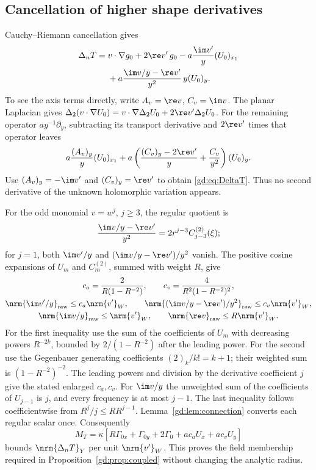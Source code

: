 \subsection{Cancellation of higher shape derivatives}
\label{gd:sec:no-loss}
Cauchy--Riemann cancellation gives
\begin{equation}\label{gd:eq:DeltaT}
 \begin{split}
 \Delta_nT={}&v\cdot\nabla g_0+2\re v'\,g_0
       -a\frac{\im v'}y(U_0)_{x_1}\\
       &+a\frac{\im v/y-\re v'}{y^2}\,y(U_0)_y .
 \end{split}
\end{equation}
To see the axis terms directly, write $A_v=\re v$, $C_v=\im v$.
The planar Laplacian gives
$\Delta_2(v\cdot\nabla U_0)
=v\cdot\nabla\Delta_2U_0+2\re v'\Delta_2U_0$.
For the remaining operator $ay^{-1}\partial_y$, subtracting its
transport derivative and $2\re v'$ times that operator leaves
\[
 a\frac{(A_v)_y}{y}(U_0)_{x_1}
 +a\left(\frac{(C_v)_y-2\re v'}y+\frac{C_v}{y^2}\right)(U_0)_y .
\]
Use $(A_v)_y=-\im v'$ and $(C_v)_y=\re v'$ to obtain
\eqref{gd:eq:DeltaT}. Thus no second derivative of the unknown
holomorphic variation appears.

For the odd monomial $v=w^j$, $j\ge3$, the regular quotient is
\[
 \frac{\im v/y-\re v'}{y^2}
                  =2r^{j-3}C_{j-3}^{(2)}(\xi);
\]
for $j=1$, both $\im v'/y$ and
$(\im v/y-\re v')/y^2$ vanish. The positive cosine expansions of $U_m$
and $C_m^{(2)}$, summed with weight $R$, give
\begin{equation}\label{gd:eq:axis-multipliers}
 \begin{gathered}
 c_a=\frac2{R(1-R^{-2})},\qquad
 c_v=\frac4{R^2(1-R^{-2})^2},\\
 \nrm{\im v'/y}_{\rm raw}\le c_a\nrm{v'}_W,\qquad
 \nrm{(\im v/y-\re v')/y^2}_{\rm raw}\le c_v\nrm{v'}_W,\\
 \nrm{\im v/y}_{\rm raw}\le\nrm{v'}_W,\qquad
 \nrm{\re v}_{\rm raw}\le R\nrm{v'}_W .
 \end{gathered}
\end{equation}
For the first inequality use the sum of the coefficients of
$U_m$ with decreasing powers $R^{-2k}$, bounded by
$2/(1-R^{-2})$ after the leading power.
For the second use the Gegenbauer generating coefficients
$(2)_k/k!=k+1$; their weighted sum is $(1-R^{-2})^{-2}$.
The leading powers and division by the derivative coefficient $j$
give the stated enlarged $c_a,c_v$.
For $\im v/y$ the unweighted sum of the coefficients of $U_{j-1}$
is $j$, and every frequency is at most $j-1$.
The last inequality follows coefficientwise from
$R^j/j\le R R^{j-1}$.
Lemma~\ref{gd:lem:connection} converts each regular scalar once.
Consequently
\begin{equation}\label{gd:eq:MT}
 M_T=\kappa\left[R\Gamma_{0x}+\Gamma_{0y}+2\Gamma_0+a c_aU_x+a c_vU_y\right]
\end{equation}
bounds $\nrm{\Delta_nT}_Y$ per unit $\nrm{v'}_W$.
This proves the field membership required in
Proposition~\ref{gd:prop:coupled} without changing the analytic radius.


